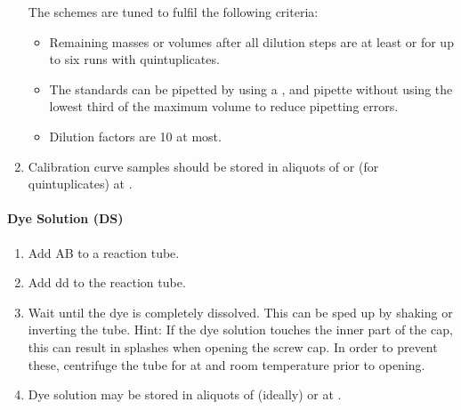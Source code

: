 \begin{enumerate}
		The schemes are tuned to fulfil the following criteria:
			\begin{itemize}
				\item Remaining masses or volumes after all dilution steps are at least  or  for up to six runs with quintuplicates.
				\item The standards can be pipetted by using a ,  and  pipette without using the lowest third of the maximum volume to reduce pipetting errors.
				\item Dilution factors are 10 at most.
			\end{itemize}
	\item Calibration curve samples should be stored in aliquots of  or  (for quintuplicates) at .
	\setcounter{sirofluor-protocol}{\value{enumi}}
\end{enumerate}

\paragraph{Dye Solution (DS)}
\begin{enumerate}
	\setcounter{enumi}{\value{sirofluor-protocol}}
	\item Add  AB to a  reaction tube.
	\item Add  dd to the reaction tube.
	\item Wait until the dye is completely dissolved. This can be sped up by shaking or inverting the tube.\newline
		Hint: If the dye solution touches the inner part of the cap, this can result in splashes when opening the screw cap. In order to prevent these, centrifuge the tube for  at  and room temperature prior to opening.
	\item Dye solution may be stored in aliquots of  (ideally) or  at .
	\setcounter{sirofluor-protocol}{\value{enumi}}
\end{enumerate}

